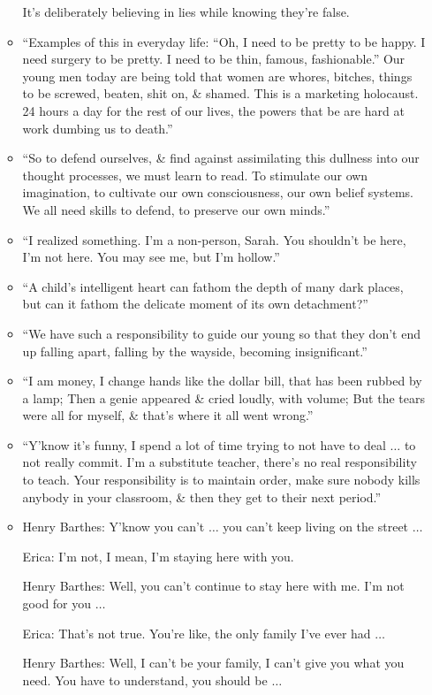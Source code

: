 \documentclass{article}
\begin{document}
\begin{enumerate}
\begin{itemize}
	    It's deliberately believing in lies while knowing they're false.
		\item ``Examples of this in everyday life: ``Oh, I need to be pretty to be happy. I need surgery to be pretty. I need to be thin, famous, fashionable.'' Our young men today are being told that women are whores, bitches, things to be screwed, beaten, shit on, \& shamed. This is a marketing holocaust. 24 hours a day for the rest of our lives, the powers that be are hard at work dumbing us to death.''
		\item ``So to defend ourselves, \& find against assimilating this dullness into our thought processes, we must learn to read. To stimulate our own imagination, to cultivate our own consciousness, our own belief systems. We all need skills to defend, to preserve our own minds.''
		\item ``I realized something. I'm a non-person, Sarah. You shouldn't be here, I'm not here. You may see me, but I'm hollow.''
		\item ``A child's intelligent heart can fathom the depth of many dark places, but can it fathom the delicate moment of its own detachment?''
		\item ``We have such a responsibility to guide our young so that they don't end up falling apart, falling by the wayside, becoming insignificant.''
		\item ``I am money, I change hands like the dollar bill, that has been rubbed by a lamp; Then a genie appeared \& cried loudly, with volume; But the tears were all for myself, \& that's where it all went wrong.''
		\item ``Y'know it's funny, I spend a lot of time trying to not have to deal $\ldots$ to not really commit. I'm a substitute teacher, there's no real responsibility to teach. Your responsibility is to maintain order, make sure nobody kills anybody in your classroom, \& then they get to their next period.''
		\item Henry Barthes: Y'know you can't $\ldots$ you can't keep living on the street $\ldots$
		
		Erica: I'm not, I mean, I'm staying here with you.
		
		Henry Barthes: Well, you can't continue to stay here with me. I'm not good for you $\ldots$
		
		Erica: That's not true. You're like, the only family I've ever had $\ldots$
		
		Henry Barthes: Well, I can't be your family, I can't give you what you need. You have to understand, you should be $\ldots$
		

\end{itemize}
\end{enumerate}
\end{document}
